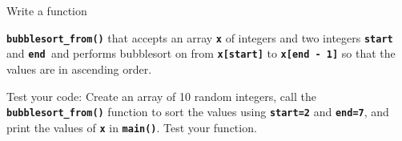 Write a function

\texttt{\textbf{bubblesort\_from()}} that accepts an array \texttt{\textbf{x}} of integers and two integers \texttt{\textbf{start}} and \texttt{\textbf{end }}and performs bubblesort on from \texttt{\textbf{x[start]}} to \texttt{\textbf{x[end - 1]}} so that the values are in ascending order.

Test your code: Create an array of 10 random integers, call the \texttt{\textbf{bubble}\textbf{s}\textbf{ort\_}\textbf{from}\textbf{()}} function to sort the values using \texttt{\textbf{start=2}} and \texttt{\textbf{end=7}}, and print the values of \texttt{\textbf{x}} in \texttt{\textbf{main()}}. Test your function.

